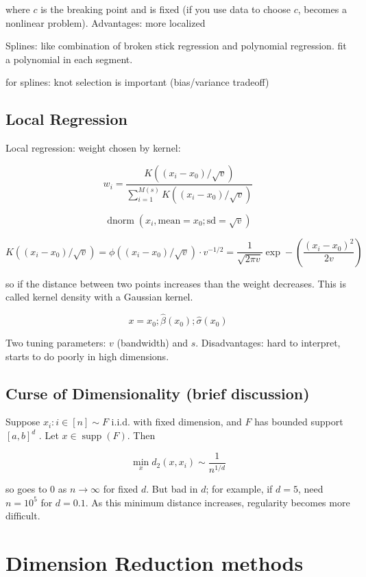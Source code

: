 where \(c\) is the breaking point and is fixed (if you use data to choose \(c\), becomes a nonlinear problem). Advantages: more localized 

Splines: like combination of broken stick regression and polynomial regression. fit a polynomial in each segment. 



for splines: knot selection is important (bias/variance tradeoff)

\subsection{Local Regression}

Local regression: weight chosen by kernel:

\[
w_i = \frac{ K((x_i - x_0)/\sqrt{v}) }{\sum_{i=1}^{M(s)} K((x_i - x_0)/\sqrt{v}) } 
\]

\[
\operatorname{dnorm}(x_i, \text{mean} = x_0; \text{sd} = \sqrt{v})
\]

\[
K((x_i - x_0)/\sqrt{v}) = \phi( (x_i - x_0)/\sqrt{v}) \cdot v^{-1/2} = \frac{1}{\sqrt{2 \pi v}} \exp - \left(  \frac{(x_i - x_0)^2}{2v} \right)
\]

so if the distance between two points increases than the weight decreases. This is called kernel density with a Gaussian kernel. 

\[
x = x_0; \hat{\beta}(x_0); \hat{\sigma}(x_0)
\]

Two tuning parameters: \(v\) (bandwidth) and \(s\). Disadvantages: hard to interpret, starts to do poorly in high dimensions.

\subsection{Curse of Dimensionality (brief discussion)}

Suppose \(x_i: i \in [n] \sim F\) i.i.d. with fixed dimension, and \(F\) has bounded support \([a,b]^d\) . Let \(x \in \operatorname{supp}(F)\). Then 

\[
\min_x d_2(x, x_i) \sim \frac{1}{n^{1/d}}
\]

so goes to 0 as \(n \to \infty\) for fixed \(d\). But bad in \(d\); for example, if \(d= 5\), need \(n = 10^5\) for \(d = 0.1\). As this minimum distance increases, regularity becomes more difficult. 

\section{Dimension Reduction methods}

